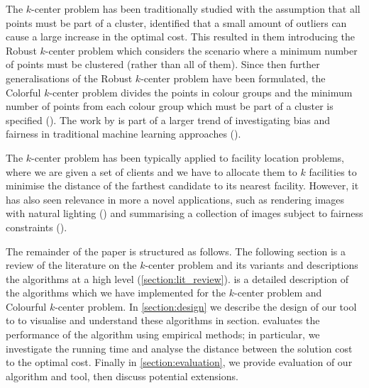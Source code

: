 The $k$-center problem has been traditionally studied with the assumption that all points must be part of a cluster, \textcite{charikar_algorithms_2001} identified that a small amount of outliers can cause a large increase in the optimal cost. This resulted in them introducing the Robust $k$-center problem which considers the scenario where a minimum number of points must be clustered (rather than all of them). Since then further generalisations of the Robust $k$-center problem have been formulated, the Colorful $k$-center problem divides the points in colour groups and the minimum number of points from each colour group which must be part of a cluster is specified (\cite{bandyapadhyay_constant_2019}). The work by \textcite{bandyapadhyay_constant_2019} is part of a larger trend of investigating bias and fairness in traditional machine learning approaches (\cite{mehrabi_survey_2019, anegg_technique_2020}).

The $k$-center problem has been typically applied to facility location problems, where we are given a set of clients and we have to allocate them to $k$ facilities to minimise the distance of the farthest candidate to its nearest facility. However, it has also seen relevance in more a novel applications, such as rendering images with natural lighting (\cite{agarwal_structured_2003}) and summarising a collection of images subject to fairness constraints (\cite{kleindessner_fair_2019}).

The remainder of the paper is structured as follows. The following section is a review of the literature on the $k$-center problem and its variants and descriptions the algorithms at a high level (\cref{section:lit_review}).  is a detailed description of the algorithms which we have implemented for the $k$-center problem and Colourful $k$-center problem. In \cref{section:design} we describe the design of our tool to to visualise and understand these algorithms in section.  evaluates the performance of the algorithm using empirical methods; in particular, we investigate the running time and analyse the distance between the solution cost to the optimal cost. Finally in \cref{section:evaluation}, we provide evaluation of our algorithm and tool, then discuss potential extensions.